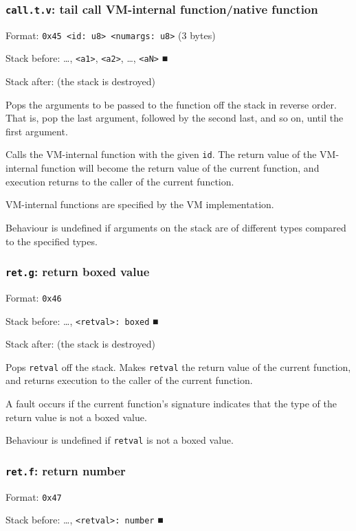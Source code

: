 \subsubsection{\texttt{call.t.v}: tail call VM-internal function/native function}
\label{sec:org22cfce9}
Format: \texttt{0x45 <id: u8> <numargs: u8>} (3 bytes)

Stack before: \ldots{}​, \texttt{<a1>}, \texttt{<a2>}, \ldots{}​, \texttt{<aN>} ■

Stack after: (the stack is destroyed)

Pops the arguments to be passed to the function off the stack in reverse
order. That is, pop the last argument, followed by the second last, and
so on, until the first argument.

Calls the VM-internal function with the given \texttt{id}. The return value of
the VM-internal function will become the return value of the current
function, and execution returns to the caller of the current function.

VM-internal functions are specified by the VM implementation.

Behaviour is undefined if arguments on the stack are of different types
compared to the specified types.

\subsubsection{\texttt{ret.g}: return boxed value}
\label{sec:org5c86ae1}
Format: \texttt{0x46}

Stack before: \ldots{}​, \texttt{<retval>: boxed} ■

Stack after: (the stack is destroyed)

Pops \texttt{retval} off the stack. Makes \texttt{retval} the return value of the
current function, and returns execution to the caller of the current
function.

A fault occurs if the current function's signature indicates that the
type of the return value is not a boxed value.

Behaviour is undefined if \texttt{retval} is not a boxed value.

\subsubsection{\texttt{ret.f}: return number}
\label{sec:org24d7891}
Format: \texttt{0x47}

Stack before: \ldots{}​, \texttt{<retval>: number} ■

